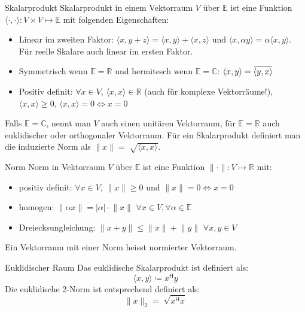 \documentclass[a4paper,10pt]{article}
\newcommand*{\hermconj}{\mathsf{H}}
\newcommand{\overbar}[1]{\mkern 1.5mu\overline{\mkern-1.5mu#1\mkern-1.5mu}\mkern 1.5mu}
\begin{document}
\begin{subbox}{Skalarprodukt}
  Skalarprodukt in einem Vektorraum $V$ über $\mathbb{E}$ ist eine Funktion $\langle \cdot, \cdot \rangle : V \times V \mapsto \mathbb{E}$ mit folgenden Eigenschaften:
  \begin{itemize}
    \item Linear im zweiten Faktor: $\langle x, y + z \rangle = \langle x, y \rangle + \langle x, z \rangle$ und $\langle x, \alpha y \rangle = \alpha \langle x, y \rangle$. Für reelle Skalare auch linear im ersten Faktor.
    \item  Symmetrisch wenn $\mathbb{E} = \mathbb{R}$ und hermitesch wenn $\mathbb{E} = \mathbb{C}$: $\langle x, y \rangle = \overbar{\langle y, x \rangle}$
    \item Positiv definit: $\forall x \in V$, $\langle x, x \rangle \in \mathbb{R}$ (auch für komplexe Vektorräume!), $\langle x, x \rangle \geq 0$, $\langle x, x \rangle = 0 \iff x = 0$
  \end{itemize}
  Falls $\mathbb{E} = \mathbb{C}$, nennt man $V$ auch einen unitären Vektorraum, für $\mathbb{E} = \mathbb{R}$ auch euklidischer oder orthogonaler Vektorraum. Für ein Skalarprodukt definiert man die induzierte Norm als $\lVert x \rVert = \sqrt[]{\langle x, x \rangle}$.
\end{subbox}

\begin{subbox}{Norm}
  Norm in Vektorraum $V$ über $\mathbb{E}$ ist eine Funktion $\lVert \cdot \rVert: V \mapsto \mathbb{R}$ mit:
  \begin{itemize}
    \item positiv definit: $\forall x \in V$, $\lVert x \rVert \geq 0$ und $\lVert x \rVert = 0 \iff x = 0$
    \item homogen: $\lVert \alpha x \rVert = \lvert \alpha \rvert \cdot \lVert x \rVert$ $\forall x \in V, \forall \alpha \in \mathbb{E}$
    \item Dreiecksungleichung: $\lVert x + y \rVert \leq \lVert x \rVert + \lVert y \rVert$ $\forall x, y \in V$
  \end{itemize}
  Ein Vektorraum mit einer Norm heisst normierter Vektorraum.
\end{subbox}

\begin{subbox}{Euklidischer Raum}
  Das euklidische Skalarprodukt ist definiert als: $$\langle x, y \rangle \coloneqq x^\hermconj y$$
  Die euklidische 2-Norm ist entsprechend definiert als: $$\lVert x \rVert_2 = \sqrt[]{x^\hermconj x}$$
\end{subbox}
\end{document}
